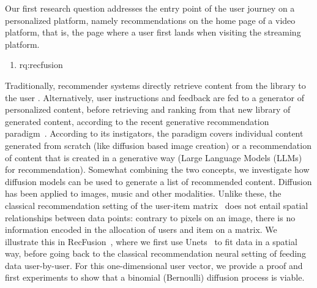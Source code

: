 Our first research question addresses the entry point of the user journey on a personalized platform, namely recommendations on the home page of a video platform, that is, the page where a user first lands when visiting the  streaming platform.
%
\begin{enumerate}[label=\textbf{RQ\arabic*},ref={RQ\arabic*},resume,leftmargin=*]
	\item \acl{rq:recfusion}\label{rq:recfusion}
\end{enumerate}
%
Traditionally, recommender systems directly retrieve content from the library to the user \todo{[REF]}. 
Alternatively, user instructions and feedback are fed to a generator of personalized content, before retrieving and ranking from that new library of generated content, according to the recent generative recommendation paradigm~\cite{generativeReco}. According to its instigators, the paradigm covers individual content generated from scratch (like diffusion based image creation) or a recommendation of content that is created in a generative way (Large Language Models (LLMs) for recommendation). Somewhat combining the two concepts, we investigate how diffusion models can be used to generate a list of recommended content. Diffusion has been applied to images, music and other modalities. Unlike these, the classical recommendation setting of the user-item matrix~\cite{MF} does not entail spatial relationships between data points: contrary to pixels on an image, there is no information encoded in the allocation of users and item on a matrix. We illustrate this in RecFusion~\cite{recfusion}, where we first use Unets~\cite{unet} to fit data in a spatial way, before going back to the classical recommendation neural setting of feeding data user-by-user. For this one-dimensional user vector, we provide a proof and first experiments to show that a binomial (Bernoulli) diffusion process is viable.

